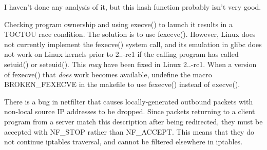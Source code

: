 \begin{DoxyRefList}
\item[\label{bug__bug000003}%
\hypertarget{bug__bug000003}{}%
\-Member \hyperlink{classNERD_1_1ConnectionServer_1_1AddressPairHash_a36bbb841fe3f2cbacb4cab2687675c4d}{\-N\-E\-R\-D\-:\-:\-Connection\-Server\-:\-:\-Address\-Pair\-Hash\-:\-:operator()} (const \-Address\-Pair \&addr) const ]\-I haven't done any analysis of it, but this hash function probably isn't very good.  
\item[\label{bug__bug000005}%
\hypertarget{bug__bug000005}{}%
\-Member \hyperlink{classNERD_1_1ConnectionServer_af4ba681fed213914c83661a1dfd8df6d}{\-N\-E\-R\-D\-:\-:\-Connection\-Server\-:\-:create\-Connection} (\hyperlink{classIPQ_1_1IpqTcpPacket}{\-I\-P\-Q\-::\-Ipq\-Tcp\-Packet} $\ast$pkt)]\-Checking program ownership and using {\ttfamily execve()} to launch it results in a \-T\-O\-C\-T\-O\-U race condition. \-The solution is to use {\ttfamily fexecve()}. \-However, \-Linux does not currently implement the {\ttfamily fexecve()} system call, and its emulation in glibc does not work on \-Linux kernels prior to 2..-\/rc1 if the calling program has called {\ttfamily setuid()} or {\ttfamily seteuid()}. \-This {\itshape may\/} have been fixed in \-Linux 2..-\/rc1. \-When a version of {\ttfamily fexecve()} that {\itshape does\/} work becomes available, undefine the macro {\ttfamily \-B\-R\-O\-K\-E\-N\-\_\-\-F\-E\-X\-E\-C\-V\-E} in the makefile to use {\ttfamily fexecve()} instead of {\ttfamily execve()}.  
\item[\label{bug__bug000004}%
\hypertarget{bug__bug000004}{}%
\-Member \hyperlink{classNERD_1_1ConnectionServer_a5b183a39539b07fe4a92ef3ad88d7c92}{\-N\-E\-R\-D\-:\-:\-Connection\-Server\-:\-:handle\-Packet} (\hyperlink{classIPQ_1_1IpqPacket}{\-I\-P\-Q\-::\-Ipq\-Packet} $\ast$pkt)]\-There is a bug in netfilter that causes locally-\/generated outbound packets with non-\/local source \-I\-P addresses to be dropped. \-Since packets returning to a client program from a server match this description after being redirected, they must be accepted with \-N\-F\-\_\-\-S\-T\-O\-P rather than \-N\-F\-\_\-\-A\-C\-C\-E\-P\-T. \-This means that they do not continue iptables traversal, and cannot be filtered elsewhere in iptables. 
\end{DoxyRefList}